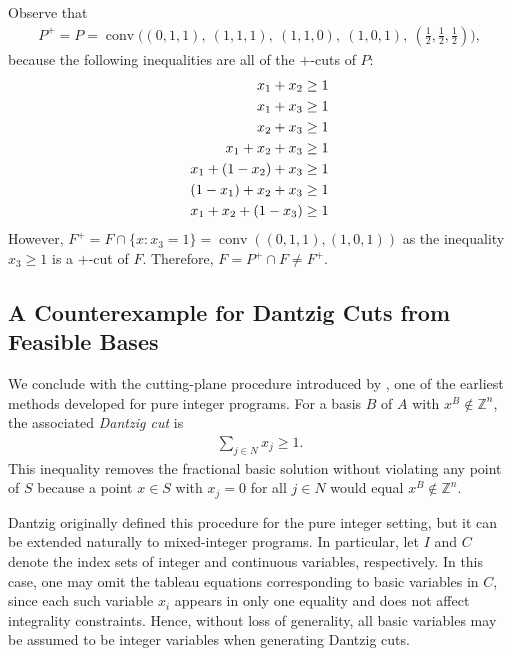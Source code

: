 \documentclass{article}
\newcommand{\Z}{\mathbb{Z}}
\begin{document}
Observe that
\begin{align}
    P^+ = P = \operatorname{conv}\big( (0,1,1),\ (1,1,1),\ (1,1,0),\ (1,0,1),\ (\tfrac{1}{2},\tfrac{1}{2},\tfrac{1}{2}) \big),
\end{align}
because the following inequalities are all of the $+$-cuts of $P$:
\begin{align}
    x_1 + x_2 \geq 1 \notag \\
    x_1 + x_3 \geq 1 \notag \\
    x_2 + x_3 \geq 1 \notag \\
    x_1 + x_2 + x_3 \geq 1 \notag \\
    x_1 + (1-x_2) + x_3 \geq 1 \notag \\
    (1-x_1) + x_2 + x_3 \geq 1 \notag \\
    x_1 + x_2 + (1-x_3) \geq 1 \notag
\end{align}
However, $F^+ = F \cap \{x: x_3 = 1\} = \operatorname{conv}((0,1,1),(1,0,1))$ as the inequality $x_3 \geq 1$ is a $+$-cut of $F$. Therefore, $F = P^+ \cap F \neq F^+$.

\subsection{A Counterexample for Dantzig Cuts from Feasible Bases} \label{subsec:counter-dantzig}

We conclude with the cutting-plane procedure introduced by \cite{dantzig1959note}, one of the earliest methods developed for pure integer programs. For a basis $B$ of $A$ with $x^B \notin \Z^n$, the associated \emph{Dantzig cut} is
\begin{align}
    \sum_{j \in N} x_j \geq 1. \label{def:dantzig-cut}
\end{align}
This inequality removes the fractional basic solution without violating any point of $S$ because a point $x \in S$ with $x_j = 0$ for all $j \in N$ would equal $x^B \notin \Z^n$.

Dantzig originally defined this procedure for the pure integer setting, but it can be extended naturally to mixed-integer programs. In particular, let $I$ and $C$ denote the index sets of integer and continuous variables, respectively. In this case, one may omit the tableau equations corresponding to basic variables in $C$, since each such variable $x_i$ appears in only one equality and does not affect integrality constraints. Hence, without loss of generality, all basic variables may be assumed to be integer variables when generating Dantzig cuts.
\end{document}
